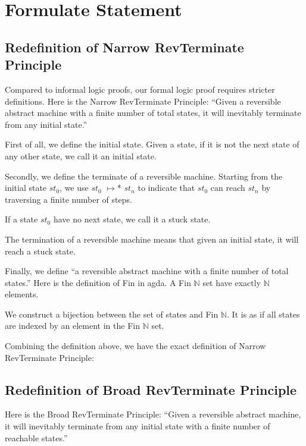 \section{Formulate Statement}

\subsection{ Redefinition of Narrow RevTerminate Principle}
Compared to informal logic proofs, our formal logic proof requires stricter definitions. 
Here is the Narrow RevTerminate Principle:
``Given a reversible abstract machine with a finite number of total states, it will inevitably terminate from any initial state.''

First of all, we define the initial state.  Given a state, if it is not the next state of any other state, we call it an initial state.



Secondly, we define the terminate of a reversible machine.
Starting from the initial state $st_{0}$, we use $st_{0}$ $\mapsto$* $st_{n}$ to indicate that $st_{0}$ can reach $st_{n}$ by traversing a finite number of steps.



If a state $st_{0}$ have no next state, we call it a stuck state.



The termination of a reversible machine means that given an initial state, it will reach a stuck state.



Finally, we define ``a reversible abstract machine with a finite number of total states.''
Here is the definition of Fin in agda.  A Fin $\mathbb{N}$ set have exactly $\mathbb{N}$ elements.



We construct a bijection between the set of states and Fin $\mathbb{N}$.
It is as if all states are indexed by an element in the Fin $\mathbb{N}$ set.



Combining the definition above, we have the exact definition of Narrow RevTerminate Principle:




\subsection{ Redefinition of Broad RevTerminate Principle }
Here is the Broad RevTerminate Principle:
``Given a reversible abstract machine, it will inevitably terminate from any initial state with a finite number of reachable states.''

